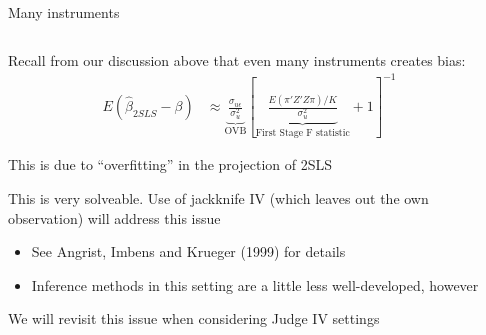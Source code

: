 \documentclass[notes,11pt, aspectratio=169]{beamer}
\newenvironment{wideitemize}{\itemize\addtolength{\itemsep}{10pt}}{\enditemize}
\begin{document}
\begin{frame}{Many instruments}
  \begin{columns}[T] %
    \begin{column}{0.8\textwidth}
      \begin{wideitemize}
      \item Recall from our discussion above that even many instruments creates bias:
    \begin{align*}
      E(\hat{\beta}_{2SLS} - \beta) &\approx \underbrace{\frac{\sigma_{u\epsilon}}{\sigma^{2}_{u}}}_{\text{OVB}}\left[\underbrace{\frac{E(\pi'Z'Z\pi)/K}{\sigma^{2}_{u}}}_{\text{First Stage  F statistic}} + 1\right]^{-1}
    \end{align*}
  \item This is due to ``overfitting'' in the projection of 2SLS
  \item This is very solveable. Use of jackknife IV (which leaves out
    the own observation) will address this issue
    \begin{itemize}
    \item See Angrist, Imbens and Krueger (1999) for details
    \item Inference methods in this setting are a little less well-developed, however
    \end{itemize}
  \item We will revisit this issue when considering Judge IV settings
      \end{wideitemize}
    \end{column}
    \begin{column}{0.5\textwidth}
    \end{column}
  \end{columns}
\end{frame}
\end{document}
